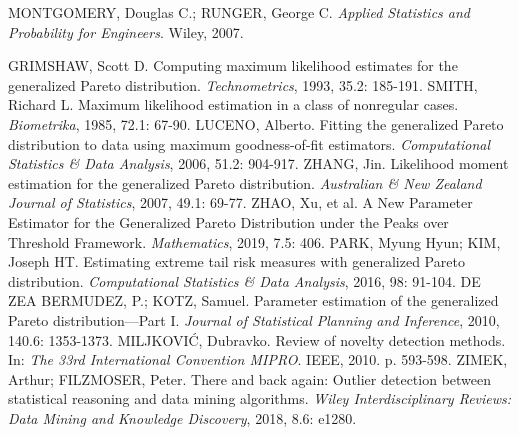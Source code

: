 \documentclass[11pt,twoside,openright]{report}
\begin{document}
\begin{thebibliography}{L}
MONTGOMERY, Douglas C.; RUNGER, George C. \textit{Applied Statistics and Probability for Engineers}. Wiley, 2007.

GRIMSHAW, Scott D. Computing maximum likelihood estimates for the generalized Pareto distribution. \textit{Technometrics}, 1993, 35.2: 185-191.
SMITH, Richard L. Maximum likelihood estimation in a class of nonregular cases. \textit{Biometrika}, 1985, 72.1: 67-90.
LUCENO, Alberto. Fitting the generalized Pareto distribution to data using maximum goodness-of-fit estimators. \textit{Computational Statistics \& Data Analysis}, 2006, 51.2: 904-917.
ZHANG, Jin. Likelihood moment estimation for the generalized Pareto distribution. \textit{Australian \& New Zealand Journal of Statistics}, 2007, 49.1: 69-77.
ZHAO, Xu, et al. A New Parameter Estimator for the Generalized Pareto Distribution under the Peaks over Threshold Framework. \textit{Mathematics}, 2019, 7.5: 406.
PARK, Myung Hyun; KIM, Joseph HT. Estimating extreme tail risk measures with generalized Pareto distribution. \textit{Computational Statistics \& Data Analysis}, 2016, 98: 91-104.
DE ZEA BERMUDEZ, P.; KOTZ, Samuel. Parameter estimation of the generalized Pareto distribution—Part I. \textit{Journal of Statistical Planning and Inference}, 2010, 140.6: 1353-1373.
MILJKOVIĆ, Dubravko. Review of novelty detection methods. In: \textit{The 33rd International Convention MIPRO}. IEEE, 2010. p. 593-598.
ZIMEK, Arthur; FILZMOSER, Peter. There and back again: Outlier detection between statistical reasoning and data mining algorithms. \textit{Wiley Interdisciplinary Reviews: Data Mining and Knowledge Discovery}, 2018, 8.6: e1280.


\end{thebibliography}
\end{document}
